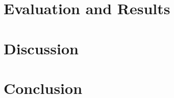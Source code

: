 \documentclass[sigconf,nonacm]{acmart}
\begin{document}
\section{Evaluation and Results}

\section{Discussion}

\section{Conclusion}



\end{document}
